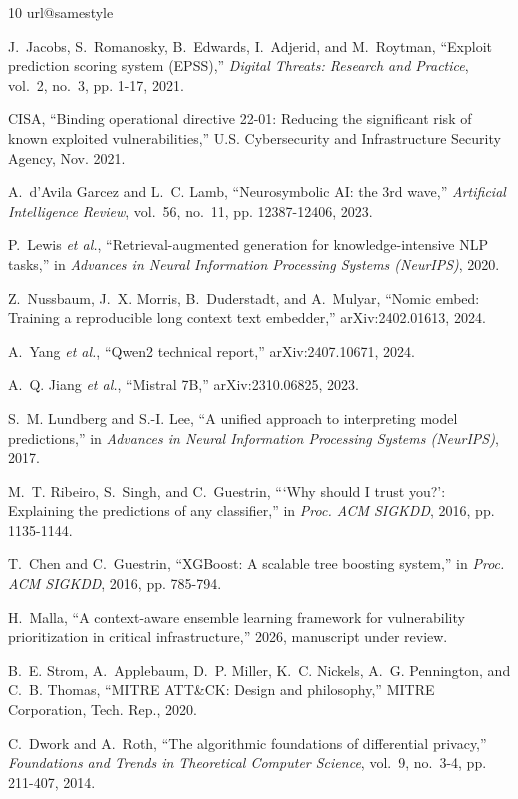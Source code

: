\documentclass[review,3p,times]{elsarticle}
\begin{document}
\begin{thebibliography}{10}
\providecommand{\url}[1]{#1}\csname url@samestyle\endcsname

J.~Jacobs, S.~Romanosky, B.~Edwards, I.~Adjerid, and M.~Roytman, ``Exploit
prediction scoring system (EPSS),'' \emph{Digital Threats: Research and
Practice}, vol.~2, no.~3, pp. 1-17, 2021.

{CISA}, ``Binding operational directive 22-01: Reducing the significant risk of
known exploited vulnerabilities,'' U.S. Cybersecurity and Infrastructure
Security Agency, Nov. 2021.

A.~d'Avila Garcez and L.~C. Lamb, ``Neurosymbolic AI: the 3rd wave,''
\emph{Artificial Intelligence Review}, vol.~56, no.~11, pp. 12387-12406, 2023.

P.~Lewis \emph{et al.}, ``Retrieval-augmented generation for knowledge-intensive
NLP tasks,'' in \emph{Advances in Neural Information Processing Systems
(NeurIPS)}, 2020.

Z.~Nussbaum, J.~X. Morris, B.~Duderstadt, and A.~Mulyar, ``Nomic embed: Training
a reproducible long context text embedder,'' arXiv:2402.01613, 2024.

A.~Yang \emph{et al.}, ``Qwen2 technical report,'' arXiv:2407.10671, 2024.

A.~Q. Jiang \emph{et al.}, ``Mistral 7B,'' arXiv:2310.06825, 2023.

S.~M. Lundberg and S.-I. Lee, ``A unified approach to interpreting model
predictions,'' in \emph{Advances in Neural Information Processing Systems
(NeurIPS)}, 2017.

M.~T. Ribeiro, S.~Singh, and C.~Guestrin, ```Why should I trust you?':
Explaining the predictions of any classifier,'' in \emph{Proc. ACM SIGKDD}, 2016,
pp. 1135-1144.

T.~Chen and C.~Guestrin, ``XGBoost: A scalable tree boosting system,'' in
\emph{Proc. ACM SIGKDD}, 2016, pp. 785-794.

H.~Malla, ``A context-aware ensemble learning framework for vulnerability
prioritization in critical infrastructure,'' 2026, manuscript under review.

B.~E. Strom, A.~Applebaum, D.~P. Miller, K.~C. Nickels, A.~G. Pennington, and
C.~B. Thomas, ``MITRE ATT\&CK: Design and philosophy,'' MITRE Corporation, Tech.
Rep., 2020.

C.~Dwork and A.~Roth, ``The algorithmic foundations of differential privacy,''
\emph{Foundations and Trends in Theoretical Computer Science}, vol.~9, no.~3-4,
pp. 211-407, 2014.

\end{thebibliography}
\end{document}
